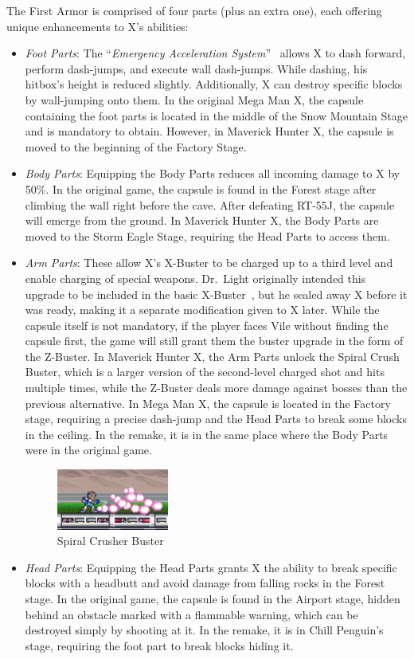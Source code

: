 The First Armor is comprised of four parts (plus an extra one), each offering unique enhancements to X's abilities:
\begin{itemize}
\item \emph{Foot Parts}: The ``\textit{Emergency Acceleration System}''~\cite{X:Manual} allows X to dash forward, perform dash-jumps, and execute wall dash-jumps. While dashing, his hitbox's height is reduced slightly. Additionally, X can destroy specific blocks by wall-jumping onto them. In the original Mega Man X, the capsule containing the foot parts is located in the middle of the Snow Mountain Stage and is mandatory to obtain. However, in Maverick Hunter X, the capsule is moved to the beginning of the Factory Stage.

\item \emph{Body Parts}: Equipping the Body Parts reduces all incoming damage to X by 50\%. In the original game, the capsule is found in the Forest stage after climbing the wall right before the cave. After defeating RT-55J, the capsule will emerge from the ground. In Maverick Hunter X, the Body Parts are moved to the Storm Eagle Stage, requiring the Head Parts to access them.

\item \emph{Arm Parts}: These allow X's X-Buster to be charged up to a third level and enable charging of special weapons. Dr.~Light originally intended this upgrade to be included in the basic X-Buster~\cite{X:Manual}, but he sealed away X before it was ready, making it a separate modification given to X later. While the capsule itself is not mandatory, if the player faces Vile without finding the capsule first, the game will still grant them the buster upgrade in the form of the Z-Buster. In Maverick Hunter X, the Arm Parts unlock the Spiral Crush Buster, which is a larger version of the second-level charged shot and hits multiple times, while the Z-Buster deals more damage against bosses than the previous alternative. In Mega Man X, the capsule is located in the Factory stage, requiring a precise dash-jump and the Head Parts to break some blocks in the ceiling. In the remake, it is in the same place where the Body Parts were in the original game.
\begin{figure}[htp]
	\centering
	\includegraphics[height=2cm]{figures/X1/weapons/Buster_4.jpg}
	\caption{Spiral Crusher Buster}
\end{figure}
\item \emph{Head Parts}: Equipping the Head Parts grants X the ability to break specific blocks with a headbutt and avoid damage from falling rocks in the Forest stage. In the original game, the capsule is found in the Airport stage, hidden behind an obstacle marked with a flammable warning, which can be destroyed simply by shooting at it. In the remake, it is in Chill Penguin's stage, requiring the foot part to break blocks hiding it.


\end{itemize}
